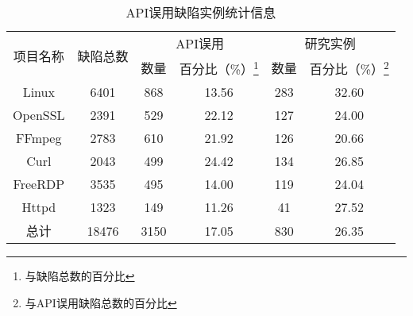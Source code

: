 \begin{table}[t]
	\centering
	\begin{minipage}[t]{0.85\linewidth} %
		\caption{API误用缺陷实例统计信息}
		\label{tab:2-3-studied}
		\begin{tabular}{cccccc}
			\hline
			\multirow{2}{*}{项目名称} & \multirow{2}{*}{缺陷总数} & \multicolumn{2}{c}{API误用}& \multicolumn{2}{c}{研究实例}\\
			\cline{3-4}\cline{5-6}
			&  & 数量 & 百分比（\%）\footnote{与缺陷总数的百分比} & 数量& 百分比（\%）\footnote{与API误用缺陷总数的百分比} \\
			\hline
			Linux & 6401 & 868 & 13.56 & 283 & 32.60 \\
			OpenSSL & 2391 & 529 & 22.12 &127  & 24.00 \\
			FFmpeg & 2783 & 610 & 21.92 & 126 & 20.66 \\
			Curl & 2043 & 499 & 24.42 & 134 & 26.85 \\
			FreeRDP & 3535 & 495 & 14.00 & 119 & 24.04 \\
			Httpd & 1323 & 149 & 11.26 & 41 & 27.52 \\
			\hline
			总计 & 18476 & 3150 & 17.05 & 830 & 26.35 \\
			\hline
		\end{tabular}
	\end{minipage}
\end{table}